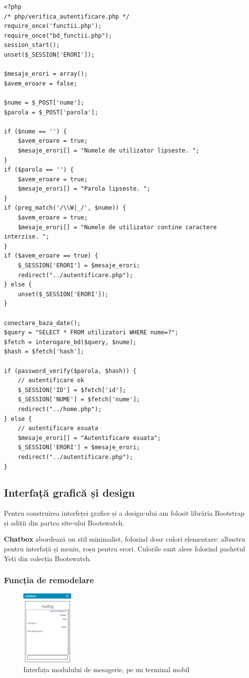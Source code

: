 \documentclass[12pt,a4paper]{article}
\begin{document}
\begin{lstlisting}
<?php
/* php/verifica_autentificare.php */
require_once('functii.php');
require_once("bd_functii.php");
session_start();
unset($_SESSION['ERORI']);

$mesaje_erori = array();
$avem_eroare = false;

$nume = $_POST['nume'];
$parola = $_POST['parola'];

if ($nume == '') {
    $avem_eroare = true;
    $mesaje_erori[] = "Numele de utilizator lipseste. ";
}
if ($parola == '') {
    $avem_eroare = true;
    $mesaje_erori[] = "Parola lipseste. ";
}
if (preg_match('/\\W|_/', $nume)) {
    $avem_eroare = true;
    $mesaje_erori[] = "Numele de utilizator contine caractere interzise. ";
}
if ($avem_eroare == true) {
    $_SESSION['ERORI'] = $mesaje_erori;
    redirect("../autentificare.php");
} else {
    unset($_SESSION['ERORI']);
}

conectare_baza_date();
$query = "SELECT * FROM utilizatori WHERE nume=?";
$fetch = interogare_bd($query, $nume);
$hash = $fetch['hash'];

if (password_verify($parola, $hash)) {
    // autentificare ok
    $_SESSION['ID'] = $fetch['id'];
    $_SESSION['NUME'] = $fetch['nume'];
    redirect("../home.php");
} else {
    // autentificare esuata
    $mesaje_erori[] = "Autentificare esuata";
    $_SESSION['ERORI'] = $mesaje_erori;
    redirect("../autentificare.php");
}
\end{lstlisting}

\newpage
\subsection{Interfață grafică și design}
Pentru construirea interfeței grafice și a design-ului am folosit librăria Bootstrap\cite{bootstrap} și adiții din partea site-ului Bootswatch\cite{bootswatch}.

\textbf{Chatbox} abordează un stil minimalist, folosind doar culori elementare: 
albastru pentru interfață și meniu, roșu pentru erori. Culorile sunt alese folosind 
pachetul Yeti\cite{yeti} din colecția Bootswatch.

\subsubsection{Funcția de remodelare}

\begin{figure} %
    \centering
    \vspace{-20px}
    \includegraphics[width=0.23\textwidth]{img/chat_mobil.jpg}
	\caption{Interfața modulului de mesagerie, pe un terminal mobil}
	\label{fig:mobil}
\end{figure}
\end{document}
